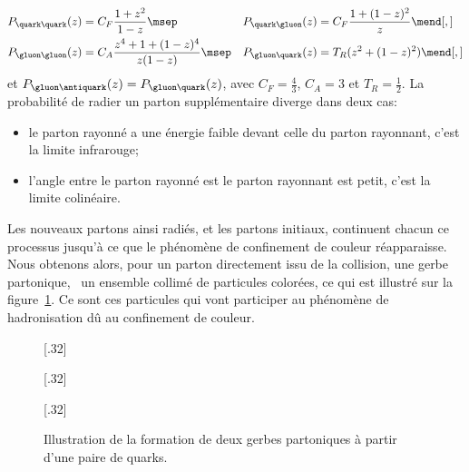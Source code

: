 \begin{align}
P_{\quark\quark}(z) &= C_F \frac{1+z^2}{1-z} \msep&
P_{\quark\gluon}(z) &= C_F \frac{1+(1-z)^2}{z} \mend[,]
\\
P_{\gluon\gluon}(z) &= C_A \frac{z^4 + 1 + (1-z)^4}{z(1-z)} \msep&
P_{\gluon\quark}(z) &= T_R (z^2+(1-z)^2) \mend[,]
\end{align}
et $P_{\gluon\antiquark}(z) = P_{\gluon\quark}(z)$,
avec
$C_F=\frac{4}{3}$,
$C_A = 3$ et
$T_R=\frac{1}{2}$.
La probabilité de radier un parton supplémentaire diverge dans deux cas:
\begin{itemize}
\item le parton rayonné a une énergie faible devant celle du parton rayonnant, c'est la limite infrarouge;
\item l'angle entre le parton rayonné est le parton rayonnant est petit, c'est la limite colinéaire.
\end{itemize}
\par Les nouveaux partons ainsi radiés, et les partons initiaux, continuent chacun ce processus jusqu'à ce que le phénomène de confinement de couleur réapparaisse. Nous obtenons alors, pour un parton directement issu de la collision, une gerbe partonique, \ie\ un ensemble collimé de particules colorées, ce qui est illustré sur la figure~\ref{fig-parton_shower}.
Ce sont ces particules qui vont participer au phénomène de hadronisation dû au confinement de couleur.
\begin{figure}[h]
\centering
{}[.32\textwidth]
{\begin{tikzpicture}

\end{tikzpicture}}
\hfill
{}[.32\textwidth]
{\begin{tikzpicture}


\end{tikzpicture}}
\hfill
{}[.32\textwidth]
{\begin{tikzpicture}



\end{tikzpicture}}

\caption{Illustration de la formation de deux gerbes partoniques à partir d'une paire de quarks.}
\label{fig-parton_shower}
\end{figure}

